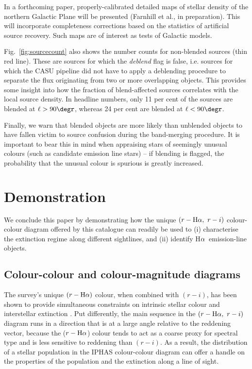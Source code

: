 \documentclass[a4paper,useAMS,usenatbib]{mn2e}
\def\ha{\mbox{H$\rm \alpha$}}
\begin{document}
In a forthcoming paper, properly-calibrated detailed maps of stellar density
of the northern Galactic Plane will be presented (Farnhill
et al., in preparation).  This will incorporate completeness
corrections based on the statistics of artificial source
recovery.  Such maps are of interest as tests of Galactic models.

Fig.~\ref{fig:sourcecount} also shows the number counts
for non-blended sources (thin red line).
These are sources for which the \emph{deblend} flag is {\sc false},
i.e. sources for which the CASU pipeline did not have to apply 
a deblending procedure to separate the flux
originating from two or more overlapping objects.
This provides some insight into how the fraction of 
blend-affected sources correlates with the local source 
density.  In headline numbers, only 11 per cent of the sources are blended
at $\ell>90\degr$, whereas 24 per cent are blended at $\ell<90\degr$.

Finally, we warn that blended objects
are more likely than unblended objects to have fallen victim
to source confusion during the band-merging procedure.  It is
important to bear this in mind when appraising stars of seemingly
unusual colours (such as candidate emission line stars) -- if 
blending is flagged, the probability that the unusual colour is 
spurious is greatly increased.

\section{Demonstration}
\label{sec:demonstration}

We conclude this paper by demonstrating how the unique
$(r-\ha,\ r-i)$ colour-colour diagram offered by this catalogue
can readily be used to
(i) characterise the extinction regime along different sightlines, and
(ii) identify \ha\ emission-line objects.

\subsection{Colour-colour and colour-magnitude diagrams}

The survey's unique $(r-\ha)$ colour,
when combined with $(r-i)$,
has been shown to provide simultaneous constraints 
on intrinsic stellar colour and interstellar extinction \citep{Drew2008}. 
Put differently, the main sequence in the $(r-\ha,\ r-i)$ diagram
runs in a direction that is at a large angle relative to the reddening vector,
because the ($r-\ha$) colour tends to act
as a coarse proxy for spectral type
and is less sensitive to reddening than $(r-i)$.
As a result, the distribution of a stellar population
in the IPHAS colour-colour diagram
can offer a handle on the properties of the population
and the extinction along a line of sight.
\end{document}
